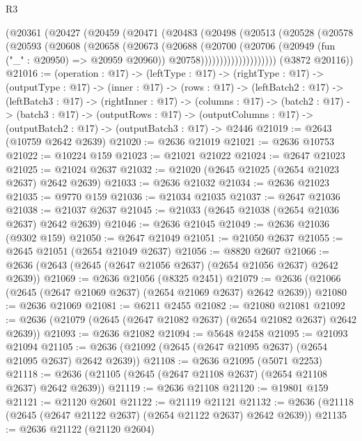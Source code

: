 \begin{lexlean}{R3}
\begin{coremodule}
              (@20361
                (@20427
                  (@20459
                    (@20471
                      (@20483
                        (@20498
                          (@20513
                            (@20528
                              (@20578
                                (@20593
                                  (@20608
                                    (@20658
                                      (@20673
                                        (@20688
                                          (@20700
                                            (@20706
                                              (@20949 (fun ("_" : @20950) => @20959 @20960))
                                              @20758))))))))))))))))))))
      (@3872 @20116))
@21016 := (operation : @17) ->
  (leftType : @17) ->
  (rightType : @17) ->
  (outputType : @17) ->
  (inner : @17) ->
  (rows : @17) ->
  (leftBatch2 : @17) ->
  (leftBatch3 : @17) ->
  (rightInner : @17) ->
  (columns : @17) ->
  (batch2 : @17) ->
  (batch3 : @17) ->
  (outputRows : @17) ->
  (outputColumns : @17) -> (outputBatch2 : @17) -> (outputBatch3 : @17) -> @2446
@21019 := @2643 (@10759 @2642 @2639)
@21020 := @2636 @21019
@21021 := @2636 @10753
@21022 := @10224 @159
@21023 := @21021 @21022
@21024 := @2647 @21023
@21025 := @21024 @2637
@21032 := @21020 (@2645 @21025 (@2654 @21023 @2637) @2642 @2639)
@21033 := @2636 @21032
@21034 := @2636 @21023
@21035 := @9770 @159
@21036 := @21034 @21035
@21037 := @2647 @21036
@21038 := @21037 @2637
@21045 := @21033 (@2645 @21038 (@2654 @21036 @2637) @2642 @2639)
@21046 := @2636 @21045
@21049 := @2636 @21036 (@9302 @159)
@21050 := @2647 @21049
@21051 := @21050 @2637
@21055 := @2645 @21051 (@2654 @21049 @2637)
@21056 := @8820 @2607
@21066 := @2636 (@2643 (@2645 (@2647 @21056 @2637) (@2654 @21056 @2637) @2642 @2639))
@21069 := @2636 @21056 (@8325 @2451)
@21079 := @2636 (@21066 (@2645 (@2647 @21069 @2637) (@2654 @21069 @2637) @2642 @2639))
@21080 := @2636 @21069
@21081 := @6211 @2455
@21082 := @21080 @21081
@21092 := @2636 (@21079 (@2645 (@2647 @21082 @2637) (@2654 @21082 @2637) @2642 @2639))
@21093 := @2636 @21082
@21094 := @5648 @2458
@21095 := @21093 @21094
@21105 := @2636 (@21092 (@2645 (@2647 @21095 @2637) (@2654 @21095 @2637) @2642 @2639))
@21108 := @2636 @21095 (@5071 @2253)
@21118 := @2636 (@21105 (@2645 (@2647 @21108 @2637) (@2654 @21108 @2637) @2642 @2639))
@21119 := @2636 @21108
@21120 := @19801 @159
@21121 := @21120 @2601
@21122 := @21119 @21121
@21132 := @2636 (@21118 (@2645 (@2647 @21122 @2637) (@2654 @21122 @2637) @2642 @2639))
@21135 := @2636 @21122 (@21120 @2604)

\end{coremodule}
\end{lexlean}
